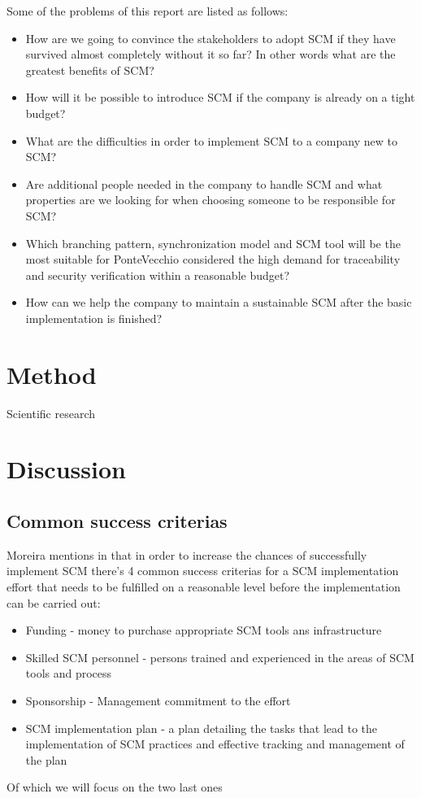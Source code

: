 \documentclass[10pt]{article}
\begin{document}
\hfill \break
\noindent Some of the problems of this report are  listed as follows:
\begin{itemize}
\item How are we going to convince the stakeholders to adopt SCM if they have survived almost completely without it so far? In other words what are the greatest benefits of SCM?
\item How will it be possible to introduce SCM if the company is already on a tight budget?
\item What are the difficulties in order to implement SCM to a company new to SCM?
\item Are additional people needed in the company to handle SCM and what properties are we looking for when choosing someone to be responsible for SCM?
\item Which branching pattern, synchronization model and SCM tool will be the most suitable for PonteVecchio considered the high demand for traceability and security verification within a reasonable budget?
\item How can we help the company to maintain a sustainable SCM after the basic implementation is finished?
\end{itemize}

\section{Method}
Scientific research 

\section{Discussion}
\subsection{Common success criterias}
Moreira mentions in \cite{Moreira} that in order to increase the chances of successfully implement SCM there's 4 common success criterias for a SCM implementation effort that needs to be fulfilled on a reasonable level before the implementation can be carried out:
\begin{itemize}
\item Funding - money to purchase appropriate SCM tools ans infrastructure
\item Skilled SCM personnel - persons trained and experienced in the areas of SCM tools and process
\item Sponsorship - Management commitment to the effort
\item SCM implementation plan - a plan detailing the tasks that lead to the implementation of SCM practices and effective tracking and management of the plan
\end{itemize}
Of which we will focus on the two last ones
\end{document}
